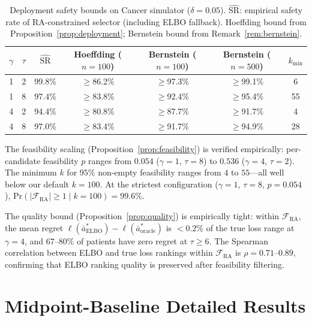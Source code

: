 \documentclass{article}
\renewcommand{\Pr}{\mathrm{Pr}}
\newcommand{\ba}{\bar{a}}
\newcommand{\cF}{\mathcal{F}}
\begin{document}
\begin{table}[h]
\centering
\caption{Deployment safety bounds on Cancer simulator ($\delta = 0.05$). $\widehat{\mathrm{SR}}$: empirical safety rate of RA-constrained selector (including ELBO fallback). Hoeffding bound from Proposition~\ref{prop:deployment}; Bernstein bound from Remark~\ref{rem:bernstein}.}
\label{tab:finite_sample}
\small
\begin{tabular}{cc cccc c}
\toprule
$\gamma$ & $\tau$ & $\widehat{\mathrm{SR}}$ & Hoeffding ($n{=}100$) & Bernstein ($n{=}100$) & Bernstein ($n{=}500$) & $k_{\min}$ \\
\midrule
1 & 2 & 99.8\% & $\geq$86.2\% & $\geq$97.3\% & $\geq$99.1\% & 6 \\
1 & 8 & 97.4\% & $\geq$83.8\% & $\geq$92.4\% & $\geq$95.4\% & 55 \\
4 & 2 & 94.4\% & $\geq$80.8\% & $\geq$87.7\% & $\geq$91.7\% & 4 \\
4 & 8 & 97.0\% & $\geq$83.4\% & $\geq$91.7\% & $\geq$94.9\% & 28 \\
\bottomrule
\end{tabular}
\end{table}

The feasibility scaling (Proposition~\ref{prop:feasibility}) is verified empirically: per-candidate feasibility $p$ ranges from $0.054$ ($\gamma{=}1$, $\tau{=}8$) to $0.536$ ($\gamma{=}4$, $\tau{=}2$). The minimum $k$ for $95\%$ non-empty feasibility ranges from $4$ to $55$---all well below our default $k = 100$. At the strictest configuration ($\gamma{=}1$, $\tau{=}8$, $p = 0.054$), $\Pr(|\cF_{\mathrm{RA}}| \geq 1 \mid k{=}100) = 99.6\%$.

The quality bound (Proposition~\ref{prop:quality}) is empirically tight: within $\cF_{\mathrm{RA}}$, the mean regret $\ell(\ba^*_{\mathrm{ELBO}}) - \ell(\ba^*_{\mathrm{oracle}})$ is $< 0.2\%$ of the true loss range at $\gamma = 4$, and $67$--$80\%$ of patients have zero regret at $\tau \geq 6$. The Spearman correlation between ELBO and true loss rankings within $\cF_{\mathrm{RA}}$ is $\rho = 0.71$--$0.89$, confirming that ELBO ranking quality is preserved after feasibility filtering.


\section{Midpoint-Baseline Detailed Results}
\label{app:midpoint}
\end{document}
